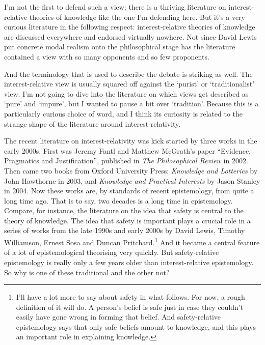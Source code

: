 \documentclass[
  11pt,
]{book}
\begin{document}
I'm not the first to defend such a view; there is a thriving literature on interest-relative theories of knowledge like the one I'm defending here. But it's a very curious literature in the following respect: interest-relative theories of knowledge are discussed everywhere and endorsed virtually nowhere. Not since David Lewis \citeyearpar{Lewis1986a} put concrete modal realism onto the philosophical stage has the literature contained a view with so many opponents and so few proponents.

And the terminology that is used to describe the debate is striking as well. The interest-relative view is usually squared off against the `purist' or `traditionalist' view. I'm not going to dive into the literature on which views get described as `pure' and `impure', but I wanted to pause a bit over `tradition'. Because this is a particularly curious choice of word, and I think its curiosity is related to the strange shape of the literature around interest-relativity.

The recent literature on interest-relativity was kick started by three works in the early 2000s. First was Jeremy Fantl and Matthew McGrath's paper ``Evidence, Pragmatics and Justification'', published in \emph{The Philosophical Review} in 2002. Then came two books from Oxford University Press: \emph{Knowledge and Lotteries} by John Hawthorne in 2003, and \emph{Knowledge and Practical Interests} by Jason Stanley in 2004. Now these works are, by standards of recent epistemology, from quite a long time ago. That is to say, two decades is a long time in epistemology. Compare, for instance, the literature on the idea that safety is central to the theory of knowledge. The idea that safety is important plays a crucial role in a series of works from the late 1990s and early 2000s by David Lewis, Timothy Williamson, Ernest Sosa and Duncan Pritchard.\footnote{I'll have a lot more to say about safety in what follows. For now, a rough definition of it will do. A person's belief is safe just in case they couldn't easily have gone wrong in forming that belief. And safety-relative epistemology says that only safe beliefs amount to knowledge, and this plays an important role in explaining knowledge.} And it became a central feature of a lot of epistemological theorising very quickly. But safety-relative epistemology is really only a few years older than interest-relative epistemology. So why is one of these traditional and the other not?
\end{document}
